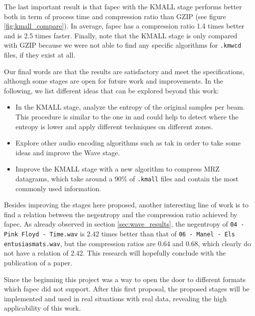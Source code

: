 The last important result is that \acrshort{fapec} with the KMALL stage performs better both in term of process time and compression ratio than GZIP (see figure \ref{fig:kmall_compare}). In average, \acrshort{fapec} has a compression ratio 1.4 times better and is 2.5 times faster. Finally, note that the KMALL stage is only compared with GZIP because we were not able to find any specific algorithms for \texttt{.kmwcd} files, if they exist at all.

Our final words are that the results are satisfactory and meet the specifications, although some stages are open for future work and improvements. In the following, we list different ideas that can be explored beyond this work:
\begin{itemize}
	\item In the KMALL stage, analyze the entropy of the original samples per beam. This procedure is similar to the one in \parencite{MBESComp} and could help to detect where the entropy is lower and apply different techniques on different zones.
	\item Explore other audio encoding algorithms such as \acrshort{tak} in order to take some ideas and improve the Wave stage.
	\item Improve the KMALL stage with a new algorithm to compress MRZ datagrams, which take around a 90\% of \texttt{.kmall} files and contain the most commonly used information.
\end{itemize}

Besides improving the stages here proposed, another interesting line of work is to find a relation between the negentropy and the compression ratio achieved by \acrshort{fapec}. As already observed in section \ref{sec:wave_results}, the negentropy of \texttt{04 - Pink Floyd - Time.wav} is 2.42 times better than that of \texttt{06 - Manel - Els entusiasmats.wav}, but the compression ratios are 0.64 and 0.68, which clearly do not have a relation of 2.42. This research will hopefully conclude with the publication of a paper.

Since the beginning this project was a way to open the door to different formats which \acrshort{fapec} did not support. After this first proposal, the proposed stages will be implemented and used in real situations with real data, revealing the high applicability of this work.
